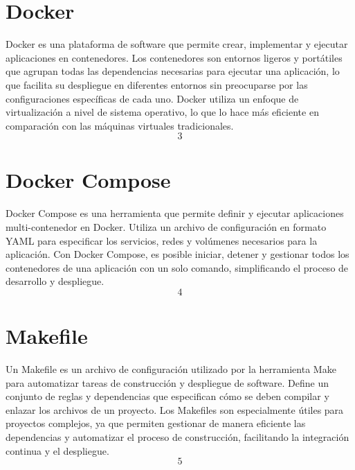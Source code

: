 \section{Docker}
Docker es una plataforma de software que permite crear, implementar y ejecutar aplicaciones en contenedores. Los contenedores son entornos ligeros y portátiles que agrupan todas las dependencias necesarias para ejecutar una aplicación, lo que facilita su despliegue en diferentes entornos sin preocuparse por las configuraciones específicas de cada uno. Docker utiliza un enfoque de virtualización a nivel de sistema operativo, lo que lo hace más eficiente en comparación con las máquinas virtuales tradicionales. \[3\]

\section{Docker Compose}
Docker Compose es una herramienta que permite definir y ejecutar aplicaciones multi-contenedor en Docker. Utiliza un archivo de configuración en formato YAML para especificar los servicios, redes y volúmenes necesarios para la aplicación. Con Docker Compose, es posible iniciar, detener y gestionar todos los contenedores de una aplicación con un solo comando, simplificando el proceso de desarrollo y despliegue. \[4\]

\section{Makefile}
Un Makefile es un archivo de configuración utilizado por la herramienta Make para automatizar tareas de construcción y despliegue de software. Define un conjunto de reglas y dependencias que especifican cómo se
deben compilar y enlazar los archivos de un proyecto. Los Makefiles son especialmente útiles para proyectos complejos, ya que permiten gestionar de manera eficiente las dependencias y automatizar el proceso de construcción, facilitando la integración continua y el despliegue. \[5\]